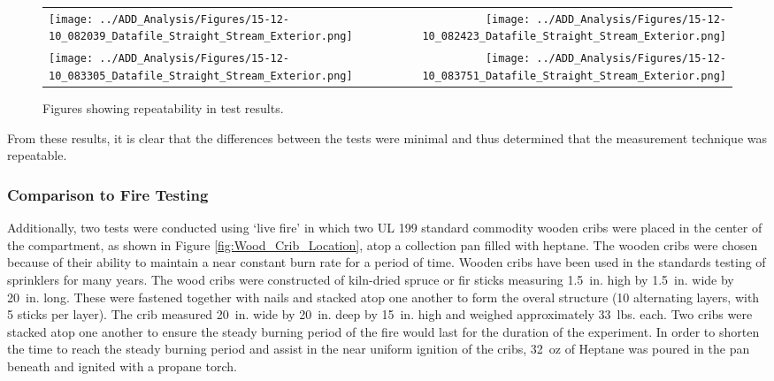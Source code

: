 \documentclass{article}
\begin{document}
\clearpage

\begin{figure}[ht]
\begin{tabular*}{\textwidth}{lr}
\texttt{[image: ../ADD\_Analysis/Figures/15-12-10\_082039\_Datafile\_Straight\_Stream\_Exterior.png]} &
\texttt{[image: ../ADD\_Analysis/Figures/15-12-10\_082423\_Datafile\_Straight\_Stream\_Exterior.png]} \\
\texttt{[image: ../ADD\_Analysis/Figures/15-12-10\_083305\_Datafile\_Straight\_Stream\_Exterior.png]} &
\texttt{[image: ../ADD\_Analysis/Figures/15-12-10\_083751\_Datafile\_Straight\_Stream\_Exterior.png]} \\
\end{tabular*}
\caption{Figures showing repeatability in test results.}
\label{fig:Repeatability_Testing}
\end{figure}

\vspace*{\baselineskip}

From these results, it is clear that the differences between the tests were minimal and thus determined that the measurement technique was repeatable.

\clearpage

\subsubsection{Comparison to Fire Testing}

Additionally, two tests were conducted using `live fire' in which two UL 199 standard commodity wooden cribs were placed in the center of the compartment, as shown in Figure \ref{fig:Wood_Crib_Location}, atop a collection pan filled with heptane. The wooden cribs were chosen because of their ability to maintain a near constant burn rate for a period of time. Wooden cribs have been used in the standards testing of sprinklers for many years. The wood cribs were constructed of kiln-dried spruce or fir sticks measuring 1.5~in. high by 1.5~in. wide by 20~in. long. These were fastened together with nails and stacked atop one another to form the overal structure (10 alternating layers, with 5 sticks per layer). The crib measured 20~in. wide by 20~in. deep by 15~in. high and weighed approximately 33~lbs. each. Two cribs were stacked atop one another to ensure the steady burning period of the fire would last for the duration of the experiment. In order to shorten the time to reach the steady burning period and assist in the near uniform ignition of the cribs, 32~oz of Heptane was poured in the pan beneath and ignited with a propane torch.
\end{document}
